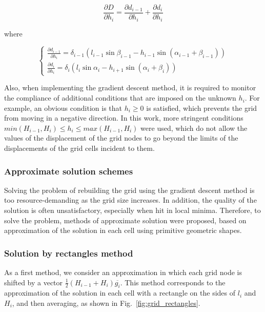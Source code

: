 \begin{equation}
\frac{\partial D}{\partial h_i} = \frac{\partial d_{i - 1}}{\partial h_i} + \frac{\partial d_i}{\partial h_i}
\end{equation}

where

\begin{equation}
\begin{cases}
\frac{\partial d_{i - 1}}{\partial h_i} = \delta_{i - 1}(l_{i - 1} \sin \beta_{i - 1} - h_{i - 1} \sin(\alpha_{i - 1} + \beta_{i - 1})) \\
\frac{\partial d_i}{\partial h_i} = \delta_i(l_i \sin \alpha_i - h_{i + 1} \sin(\alpha_i + \beta_i))
\end{cases}
\end{equation}

Also, when implementing the gradient descent method, it is required to monitor the compliance of additional conditions that are imposed on the unknown $h_i$.
For example, an obvious condition is that $h_i \ge 0$ is satisfied, which prevents the grid from moving in a negative direction.
In this work, more stringent conditions $min(H_{i - 1}, H_i) \le h_i \le max(H_{i - 1}, H_i)$ were used, which do not allow the values of the displacement of the grid nodes to go beyond the limits of the displacements of the grid cells incident to them.

\subsubsection{Approximate solution schemes}

Solving the problem of rebuilding the grid using the gradient descent method is too resource-demanding as the grid size increases.
In addition, the quality of the solution is often unsatisfactory, especially when hit in local minima.
Therefore, to solve the problem, methods of approximate solution were proposed, based on approximation of the solution in each cell using primitive geometric shapes.

\subsubsection{Solution by rectangles method}

As a first method, we consider an approximation in which each grid node is shifted by a vector $\frac{1}{2}(H_{i - 1} + H_i)\overline{g_i}$.
This method corresponds to the approximation of the solution in each cell with a rectangle on the sides of $l_i$ and $H_i$, and then averaging, as shown in Fig.~\ref{fig:grid_rectangles}.

